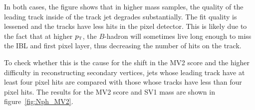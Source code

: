 %
In both cases, the figure shows that in higher mass samples, the quality of the leading track inside of the track jet degrades substantially. The fit quality is lessened and the tracks have less hits in the pixel detector. This is likely due to the fact that at higher $p_{\textrm{\footnotesize\sc t}}$, the $B$-hadron will sometimes live long enough to miss the IBL and first pixel layer, thus decreasing the number of hits on the track. 

To check whether this is the cause for the shift in the MV2 score and the higher difficulty in reconstructing secondary vertices, jets whose leading track have at least four pixel hits are compared with those whose tracks have less than four pixel hits. The results for the MV2 score and SV1 mass are shown in figure~\ref{fig:Nph_MV2}. 
%
\begin{figure}[h!]
  \centering
  \captionsetup{justification=centering}


\end{figure}
